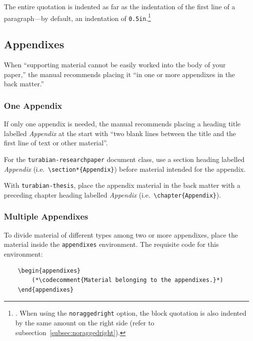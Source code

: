 \documentclass{article}
\newcommand{\codecomment}[1]{\textrm{$\langle$\emph{#1}$\rangle$}}
\newcommand{\textcmd}[1]{\texttt{\textbackslash #1}}
\begin{document}
The entire quotation is indented as far as the indentation of the first line of a paragraph---by default, an indentation of \texttt{0.5in}.\footnote{\autocite[361]{turabian_manual_2018}. When using the \texttt{noraggedright} option, the block quotation is also indented by the same amount on the right side (refer to subsection~\ref{subsec:noraggedright}).}


\subsection{Appendixes}
\label{subsec:appendixes}

When ``supporting material cannot be easily worked into the body of your paper,'' the manual recommends placing it ``in one or more appendixes in the back matter.''\autocite[410]{turabian_manual_2018}

\subsubsection*{One Appendix}

If only one appendix is needed, the manual recommends placing a heading title labelled \emph{Appendix} at the start with ``two blank lines between the title and the first line of text or other material''.\autocite[410]{turabian_manual_2018}

For the \texttt{turabian-researchpaper} document class, use a section heading labelled \emph{Appendix} (i.e.~\texttt{\textcmd{section*}\{Appendix\}}) before material intended for the appendix.

With \texttt{turabian-thesis}, place the appendix material in the back matter with a preceding chapter heading labelled \emph{Appendix} (i.e.~\texttt{\textcmd{chapter}\{Appendix\}}).

\clearpage
\subsubsection*{Multiple Appendixes}

To divide material of different types among two or more appendixes,\autocite[410]{turabian_manual_2018} place the material inside the \texttt{appendixes} environment. The requisite code for this environment:

\begin{lstlisting}
	\begin{appendixes}
		(*\codecomment{Material belonging to the appendixes.}*)
	\end{appendixes}
\end{lstlisting}
\end{document}

